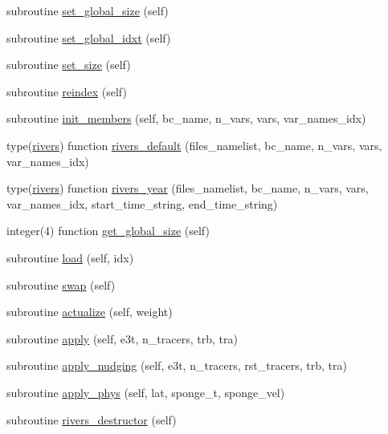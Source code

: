 \begin{DoxyCompactItemize}
\item 
subroutine \mbox{\hyperlink{namespacerivers__mod_a1b5ad1b541c200f76f6853d0643cff8c}{set\+\_\+global\+\_\+size}} (self)
\item 
subroutine \mbox{\hyperlink{namespacerivers__mod_a343eb9cf977ea49b57ba6749c2af6d24}{set\+\_\+global\+\_\+idxt}} (self)
\item 
subroutine \mbox{\hyperlink{namespacerivers__mod_a0069946854e918ce95bc352a042e4adc}{set\+\_\+size}} (self)
\item 
subroutine \mbox{\hyperlink{namespacerivers__mod_ade2f261a72fc01d0b54f21c4e93bc86b}{reindex}} (self)
\item 
subroutine \mbox{\hyperlink{namespacerivers__mod_a59adda30a3e127948ece594ab4fd18a0}{init\+\_\+members}} (self, bc\+\_\+name, n\+\_\+vars, vars, var\+\_\+names\+\_\+idx)
\item 
type(\mbox{\hyperlink{structrivers__mod_1_1rivers}{rivers}}) function \mbox{\hyperlink{namespacerivers__mod_a3f4dae3b19d0f77f9f17a8059c9a9bd7}{rivers\+\_\+default}} (files\+\_\+namelist, bc\+\_\+name, n\+\_\+vars, vars, var\+\_\+names\+\_\+idx)
\item 
type(\mbox{\hyperlink{structrivers__mod_1_1rivers}{rivers}}) function \mbox{\hyperlink{namespacerivers__mod_a16f08543441d9aaf0ebf805e9f68c265}{rivers\+\_\+year}} (files\+\_\+namelist, bc\+\_\+name, n\+\_\+vars, vars, var\+\_\+names\+\_\+idx, start\+\_\+time\+\_\+string, end\+\_\+time\+\_\+string)
\item 
integer(4) function \mbox{\hyperlink{namespacerivers__mod_a057ffe419cdf846afa3ce68cbdf8568d}{get\+\_\+global\+\_\+size}} (self)
\item 
subroutine \mbox{\hyperlink{namespacerivers__mod_ad86f8407065f8e1beffbd06052d05eea}{load}} (self, idx)
\item 
subroutine \mbox{\hyperlink{namespacerivers__mod_a340271fac5c88e55d12cbfd63f064b23}{swap}} (self)
\item 
subroutine \mbox{\hyperlink{namespacerivers__mod_a75772a76ea5f75ae4e5b10ff9d01b606}{actualize}} (self, weight)
\item 
subroutine \mbox{\hyperlink{namespacerivers__mod_a020814a802ff4a0fe8f51652fd0e6479}{apply}} (self, e3t, n\+\_\+tracers, trb, tra)
\item 
subroutine \mbox{\hyperlink{namespacerivers__mod_afea9ef8cef5df5fafc3e107c2f3b0244}{apply\+\_\+nudging}} (self, e3t, n\+\_\+tracers, rst\+\_\+tracers, trb, tra)
\item 
subroutine \mbox{\hyperlink{namespacerivers__mod_ae617fb601ff0091298f2bfff4dfbae40}{apply\+\_\+phys}} (self, lat, sponge\+\_\+t, sponge\+\_\+vel)
\item 
subroutine \mbox{\hyperlink{namespacerivers__mod_ac07ba32b687341d15b82c27c197cd062}{rivers\+\_\+destructor}} (self)
\end{DoxyCompactItemize}


